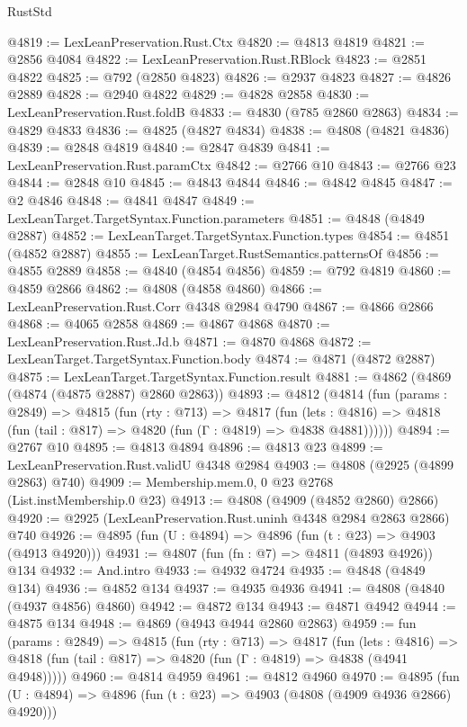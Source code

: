 \begin{lexlean}{RustStd}
\begin{coremodule}
@4819 := LexLeanPreservation.Rust.Ctx
@4820 := @4813 @4819
@4821 := @2856 @4084
@4822 := LexLeanPreservation.Rust.RBlock
@4823 := @2851 @4822
@4825 := @792 (@2850 @4823)
@4826 := @2937 @4823
@4827 := @4826 @2889
@4828 := @2940 @4822
@4829 := @4828 @2858
@4830 := LexLeanPreservation.Rust.foldB
@4833 := @4830 (@785 @2860 @2863)
@4834 := @4829 @4833
@4836 := @4825 (@4827 @4834)
@4838 := @4808 (@4821 @4836)
@4839 := @2848 @4819
@4840 := @2847 @4839
@4841 := LexLeanPreservation.Rust.paramCtx
@4842 := @2766 @10
@4843 := @2766 @23
@4844 := @2848 @10
@4845 := @4843 @4844
@4846 := @4842 @4845
@4847 := @2 @4846
@4848 := @4841 @4847
@4849 := LexLeanTarget.TargetSyntax.Function.parameters
@4851 := @4848 (@4849 @2887)
@4852 := LexLeanTarget.TargetSyntax.Function.types
@4854 := @4851 (@4852 @2887)
@4855 := LexLeanTarget.RustSemantics.patternsOf
@4856 := @4855 @2889
@4858 := @4840 (@4854 @4856)
@4859 := @792 @4819
@4860 := @4859 @2866
@4862 := @4808 (@4858 @4860)
@4866 := LexLeanPreservation.Rust.Corr @4348 @2984 @4790
@4867 := @4866 @2866
@4868 := @4065 @2858
@4869 := @4867 @4868
@4870 := LexLeanPreservation.Rust.Jd.b
@4871 := @4870 @4868
@4872 := LexLeanTarget.TargetSyntax.Function.body
@4874 := @4871 (@4872 @2887)
@4875 := LexLeanTarget.TargetSyntax.Function.result
@4881 := @4862 (@4869 (@4874 (@4875 @2887) @2860 @2863))
@4893 := @4812
    (@4814
      (fun (params : @2849) =>
      @4815
        (fun (rty : @713) =>
        @4817
          (fun (lets : @4816) =>
          @4818 (fun (tail : @817) => @4820 (fun (Γ : @4819) => @4838 @4881))))))
@4894 := @2767 @10
@4895 := @4813 @4894
@4896 := @4813 @23
@4899 := LexLeanPreservation.Rust.validU @4348 @2984
@4903 := @4808 (@2925 (@4899 @2863) @740)
@4909 := Membership.mem.{0, 0} @23 @2768 (List.instMembership.{0} @23)
@4913 := @4808 (@4909 (@4852 @2860) @2866)
@4920 := @2925 (LexLeanPreservation.Rust.uninh @4348 @2984 @2863 @2866) @740
@4926 := @4895 (fun (U : @4894) => @4896 (fun (t : @23) => @4903 (@4913 @4920)))
@4931 := @4807 (fun (fn : @7) => @4811 (@4893 @4926)) @134
@4932 := And.intro
@4933 := @4932 @4724
@4935 := @4848 (@4849 @134)
@4936 := @4852 @134
@4937 := @4935 @4936
@4941 := @4808 (@4840 (@4937 @4856) @4860)
@4942 := @4872 @134
@4943 := @4871 @4942
@4944 := @4875 @134
@4948 := @4869 (@4943 @4944 @2860 @2863)
@4959 := fun (params : @2849) =>
  @4815
    (fun (rty : @713) =>
    @4817
      (fun (lets : @4816) =>
      @4818 (fun (tail : @817) => @4820 (fun (Γ : @4819) => @4838 (@4941 @4948)))))
@4960 := @4814 @4959
@4961 := @4812 @4960
@4970 := @4895 (fun (U : @4894) => @4896 (fun (t : @23) => @4903 (@4808 (@4909 @4936 @2866) @4920)))

\end{coremodule}
\end{lexlean}
